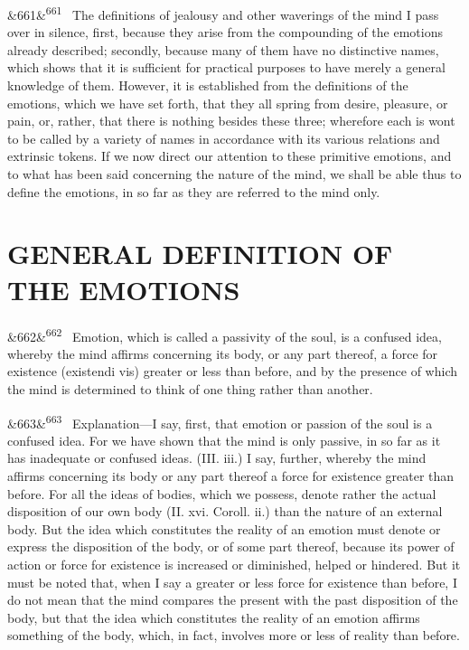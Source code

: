 \documentclass[12pt]{article}
\newcommand{\para}[1][]{\par\noindent\ifx&#1&\else\textsuperscript{\footnotesize #1}~\fi}
\begin{document}
\para[661] The definitions of jealousy and other waverings of the mind I pass over in silence, first, because they arise from the compounding of the emotions already described; secondly, because many of them have no distinctive names, which shows that it is sufficient for practical purposes to have merely a general knowledge of them. However, it is established from the definitions of the emotions, which we have set forth, that they all spring from desire, pleasure, or pain, or, rather, that there is nothing besides these three; wherefore each is wont to be called by a variety of names in accordance with its various relations and extrinsic tokens. If we now direct our attention to these primitive emotions, and to what has been said concerning the nature of the mind, we shall be able thus to define the emotions, in so far as they are referred to the mind only.

\section*{GENERAL DEFINITION OF THE EMOTIONS}

\para[662] Emotion, which is called a passivity of the soul, is a confused idea, whereby the mind affirms concerning its body, or any part thereof, a force for existence (existendi vis) greater or less than before, and by the presence of which the mind is determined to think of one thing rather than another.

\para[663] Explanation---I say, first, that emotion or passion of the soul is a confused idea. For we have shown that the mind is only passive, in so far as it has inadequate or confused ideas. (III. iii.) I say, further, whereby the mind affirms concerning its body or any part thereof a force for existence greater than before. For all the ideas of bodies, which we possess, denote rather the actual disposition of our own body (II. xvi. Coroll. ii.) than the nature of an external body. But the idea which constitutes the reality of an emotion must denote or express the disposition of the body, or of some part thereof, because its power of action or force for existence is increased or diminished, helped or hindered. But it must be noted that, when I say a greater or less force for existence than before, I do not mean that the mind compares the present with the past disposition of the body, but that the idea which constitutes the reality of an emotion affirms something of the body, which, in fact, involves more or less of reality than before.
\end{document}
